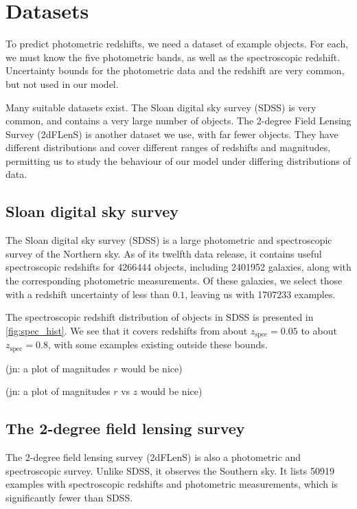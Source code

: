 \documentclass[11pt,twoside,openright]{report}
\newcommand\jn[1]{{\color{red}(jn: #1)}}
\begin{document}
  \section{Datasets}
  To predict photometric redshifts, we need a dataset of example objects. For each, we must know the five photometric bands, as well as the spectroscopic redshift. Uncertainty bounds for the photometric data and the redshift are very common, but not used in our model.

  Many suitable datasets exist. The Sloan digital sky survey (SDSS) is very common, and contains a very large number of objects. The 2-degree Field Lensing Survey (2dFLenS) is another dataset we use, with far fewer objects. They have different distributions and cover different ranges of redshifts and magnitudes, permitting us to study the behaviour of our model under differing distributions of data.

  \subsection{Sloan digital sky survey}
  The Sloan digital sky survey (SDSS) is a large photometric and spectroscopic survey of the Northern sky. As of its twelfth data release, it contains useful spectroscopic redshifts for \SI{4266444}{} objects, including \SI{2401952}{} galaxies, along with the corresponding photometric measurements. \citep{SDSS} Of these galaxies, we select those with a redshift uncertainty of less than $0.1$, leaving us with \SI{1707233}{} examples.

  The spectroscopic redshift distribution of objects in SDSS is presented in \cref{fig:spec_hist}. We see that it covers redshifts from about $z_\mathrm{spec} = 0.05$ to about $z_\mathrm{spec} = 0.8$, with some examples existing outside these bounds.

  \jn{a plot of magnitudes $r$ would be nice}

  \jn{a plot of magnitudes $r$ vs $z$ would be nice}

  \subsection{The 2-degree field lensing survey}
  The 2-degree field lensing survey (2dFLenS) is also a photometric and spectroscopic survey. Unlike SDSS, it observes the Southern sky. It lists \SI{50919}{} examples with spectroscopic redshifts and photometric measurements, which is significantly fewer than SDSS.
\end{document}
